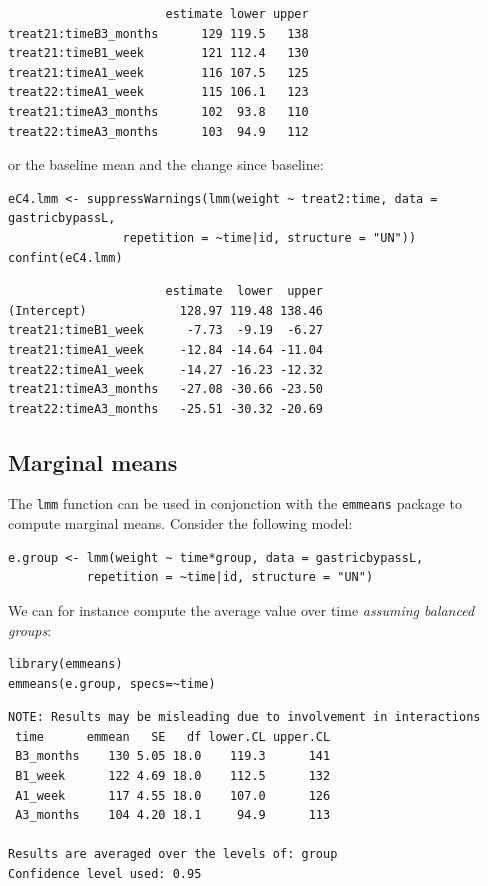 \documentclass[12pt]{article}
\begin{document}
\begin{verbatim}
                      estimate lower upper
treat21:timeB3_months      129 119.5   138
treat21:timeB1_week        121 112.4   130
treat21:timeA1_week        116 107.5   125
treat22:timeA1_week        115 106.1   123
treat21:timeA3_months      102  93.8   110
treat22:timeA3_months      103  94.9   112
\end{verbatim}


or the baseline mean and the change since baseline:
\lstset{language=r,label= ,caption= ,captionpos=b,numbers=none}
\begin{lstlisting}
eC4.lmm <- suppressWarnings(lmm(weight ~ treat2:time, data = gastricbypassL,
				repetition = ~time|id, structure = "UN"))
confint(eC4.lmm)
\end{lstlisting}

\begin{verbatim}
                      estimate  lower  upper
(Intercept)             128.97 119.48 138.46
treat21:timeB1_week      -7.73  -9.19  -6.27
treat21:timeA1_week     -12.84 -14.64 -11.04
treat22:timeA1_week     -14.27 -16.23 -12.32
treat21:timeA3_months   -27.08 -30.66 -23.50
treat22:timeA3_months   -25.51 -30.32 -20.69
\end{verbatim}

\subsection{Marginal means}
\label{sec:org6620279}

The \texttt{lmm} function can be used in conjonction with the \texttt{emmeans}
package to compute marginal means. Consider the following model:
\lstset{language=r,label= ,caption= ,captionpos=b,numbers=none}
\begin{lstlisting}
e.group <- lmm(weight ~ time*group, data = gastricbypassL,
	       repetition = ~time|id, structure = "UN")
\end{lstlisting}

We can for instance compute the average value over time \emph{assuming balanced groups}:
\lstset{language=r,label= ,caption= ,captionpos=b,numbers=none}
\begin{lstlisting}
library(emmeans)
emmeans(e.group, specs=~time)
\end{lstlisting}

\begin{verbatim}
NOTE: Results may be misleading due to involvement in interactions
 time      emmean   SE   df lower.CL upper.CL
 B3_months    130 5.05 18.0    119.3      141
 B1_week      122 4.69 18.0    112.5      132
 A1_week      117 4.55 18.0    107.0      126
 A3_months    104 4.20 18.1     94.9      113

Results are averaged over the levels of: group 
Confidence level used: 0.95
\end{verbatim}
\end{document}

